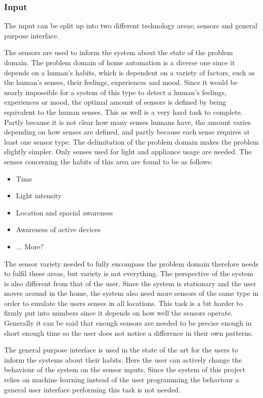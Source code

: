 \subsubsection{Input}
The input can be split up into two different technology areas; sensors and general purpose interface.

The sensors are used to inform the system about the state of the problem domain. The problem domain of home automation is a diverse one since it depends on a human's habits, which is dependent on a variety of factors, such as the human's senses, their feelings, experiences and mood. Since it would be nearly impossible for a system of this type to detect a human's feelings, experiences or mood, the optimal amount of sensors is defined by being equivalent to the human senses. This as well is a very hard task to complete. Partly because it is not clear how many senses humans have, the amount varies depending on how senses are defined, and partly because each sense requires at least one sensor type. The delimitation of the problem domain makes the problem slightly simpler. Only senses used for light and appliance usage are needed. The senses concerning the habits of this area are found to be as follows:
\begin{itemize}
	\item Time
	\item Light intensity
	\item Location and spacial awareness
	\item Awareness of active devices
	\item ... More?
\end{itemize}
The sensor variety needed to fully encompass the problem domain therefore needs to fulfil these areas, but variety is not everything. The perspective of the system is also different from that of the user. Since the system is stationary and the user moves around in the home, the system also need more sensors of the same type in order to emulate the users senses in all locations. This task is a bit harder to firmly put into numbers since it depends on how well the sensors operate. Generally it can be said that enough sensors are needed to be precise enough in short enough time so the user does not notice a difference in their own patterns.

The general purpose interface is used in the state of the art for the users to inform the systems about their habits. Here the user can actively change the behaviour of the system on the sensor inputs. Since the system of this project relies on machine learning instead of the user programming the behaviour a general user interface performing this task is not needed.

